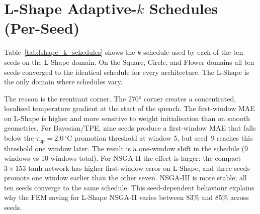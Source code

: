 \section*{L-Shape Adaptive-$k$ Schedules (Per-Seed)}
\label{app:lshape_kschedules}

Table~\ref{tab:lshape_k_schedules} shows the $k$-schedule used by each of the
ten seeds on the L-Shape domain.
On the Square, Circle, and Flower domains all ten seeds converged to the
identical schedule for every architecture.
The L-Shape is the only domain where schedules vary.

The reason is the reentrant corner.
The 270° corner creates a concentrated, localised temperature gradient at the
start of the quench.
The first-window MAE on L-Shape is higher and more sensitive to weight
initialisation than on smooth geometries.
For Bayesian/TPE, nine seeds produce a first-window MAE that falls below the
$\tau_\mathrm{up}=2.0\,^\circ\mathrm{C}$ promotion threshold at window 5,
but seed~9 reaches this threshold one window later.
The result is a one-window shift in the schedule (9 windows vs 10 windows
total).
For NSGA-II the effect is larger: the compact $3{\times}153$ tanh network has
higher first-window error on L-Shape, and three seeds promote one window
earlier than the other seven.
NSGA-III is more stable; all ten seeds converge to the same schedule.
This seed-dependent behaviour explains why the FEM saving for L-Shape
NSGA-II varies between 83\% and 85\% across seeds.

